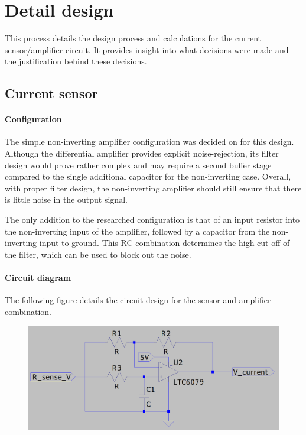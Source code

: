 \chapter{Detail design}\label{ch:detail_design}
This process details the design process and calculations for the current sensor/amplifier circuit. It provides insight into
what decisions were made and the justification behind these decisions.

\section{Current sensor}\label{sec:current_sensor_design}
\subsubsection{Configuration}\label{sec:current_sensor_config}

The simple non-inverting amplifier configuration was decided on for this design. Although the differential amplifier provides explicit noise-rejection,
its filter design would prove rather complex and may require a second buffer stage compared to the single additional capacitor for the non-inverting case.
Overall, with proper filter design, the non-inverting amplifier should still ensure that there is little noise in the output signal.

The only addition to the researched configuration is that of an input resistor into the non-inverting input of the amplifier, followed by a capacitor
from the non-inverting input to ground. This RC combination determines the high cut-off of the filter, which can be used to block out the noise.

\subsubsection{Circuit diagram}\label{sec:current_sensor_circuit}
The following figure details the circuit design for the sensor and amplifier combination.

\begin{figure}[h!]
  \centering
  \includegraphics[width=.8\linewidth]{Figures/Circuit}
  \label{fig:circuit-diagram}
\end{figure}

